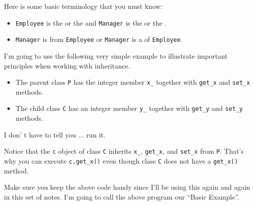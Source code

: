 Here is some basic terminology that you must know:

\begin{itemize}
\item
  \texttt{Employee} is the  or the
   and \texttt{Manager} is the  or
  the .
\item
  \texttt{Manager} is  from \texttt{Employee} or
  \texttt{Manager} is a  of \texttt{Employee}.
\end{itemize}

I'm going to use the following very simple example to illustrate
important principles when working with inheritance.

\begin{itemize}
\item
  The parent class \texttt{P} has the integer member \verb!x_! together
  with \verb!get_x! and \verb!set_x! methods.
\item
  The child class \texttt{C} has an integer member \verb!y_! together
  with \verb!get_y! and \verb!set_y! methods.
\end{itemize}

I don' t have to tell you ... run it.


Notice that the \texttt{c} object of class \texttt{C} inherits \verb!x_!,
\verb!get_x!, and \verb!set_x! from \texttt{P}. That's why you can
execute \verb!c.get_x()! even though class \texttt{C} does not have a
\verb!get_x()! method.

Make sure you keep the above code handy since I'll be using this again
and again in this set of notes. I'm going to call the above program our
``Basic Example''.

